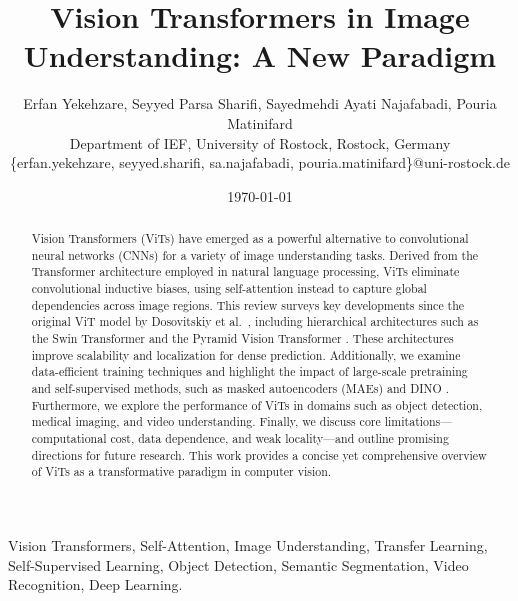 \documentclass[conference]{IEEEtran}
\begin{document}
\date{\today}
\title{Vision Transformers in Image Understanding: A New Paradigm\\
}
\author{
Erfan Yekehzare, Seyyed Parsa Sharifi, Sayedmehdi Ayati Najafabadi, Pouria Matinifard \\
Department of IEF, University of Rostock, Rostock, Germany \\
\{erfan.yekehzare, seyyed.sharifi, sa.najafabadi, pouria.matinifard\}@uni-rostock.de
}

\maketitle

\begin{abstract}
Vision Transformers (ViTs) have emerged as a powerful alternative to convolutional neural networks (CNNs) for a variety of image understanding tasks. Derived from the Transformer architecture employed in natural language processing, ViTs eliminate convolutional inductive biases, using self-attention instead to capture global dependencies across image regions. This review surveys key developments since the original ViT model by Dosovitskiy et al.~\cite{dosovitskiy2021an}, including hierarchical architectures such as the Swin Transformer \cite{liu2021swin} and the Pyramid Vision Transformer \cite{wang2021pyramidvisiontransformerversatile}. These architectures improve scalability and localization for dense prediction. Additionally, we examine data-efficient training techniques and highlight the impact of large-scale pretraining and self-supervised methods, such as masked autoencoders (MAEs) \cite{he2022masked} and DINO \cite{caron2021emerging}. Furthermore, we explore the performance of ViTs in domains such as object detection, medical imaging, and video understanding. Finally, we discuss core limitations—computational cost, data dependence, and weak locality—and outline promising directions for future research. This work provides a concise yet comprehensive overview of ViTs as a transformative paradigm in computer vision.
\end{abstract}




\begin{IEEEkeywords}
Vision Transformers, Self-Attention, Image Understanding, Transfer Learning, Self-Supervised Learning, Object Detection, Semantic Segmentation, Video Recognition, Deep Learning.
\end{IEEEkeywords}
\end{document}
